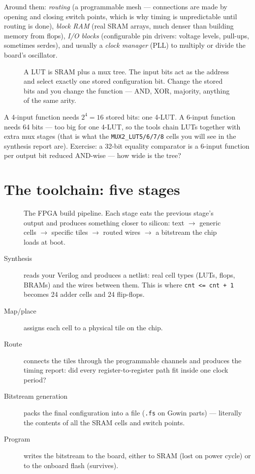 Around them: \emph{routing} (a programmable mesh --- connections are made by
opening and closing switch points, which is why timing is unpredictable until
routing is done), \emph{block RAM} (real SRAM arrays, much denser than building
memory from flops), \emph{I/O blocks} (configurable pin drivers: voltage
levels, pull-ups, sometimes serdes), and usually a \emph{clock manager} (PLL)
to multiply or divide the board's oscillator.

\begin{figure}[htbp]\centering

\caption{A LUT is SRAM plus a mux tree. The input bits act as the address and
select exactly one stored configuration bit. Change the stored bits and you
change the function --- AND, XOR, majority, anything of the same arity.}
\label{fig:lut}
\end{figure}

\begin{example}
A 4-input function needs $2^4=16$ stored bits: one 4-LUT. A 6-input function
needs 64 bits --- too big for one 4-LUT, so the tools chain LUTs together with
extra mux stages (that is what the \texttt{MUX2\_LUT5/6/7/8} cells you will see
in the synthesis report are). Exercise: a 32-bit equality comparator is a
6-input function per output bit reduced AND-wise --- how wide is the tree?
\end{example}

\section{The toolchain: five stages}

\begin{figure}[htbp]\centering

\caption{The FPGA build pipeline. Each stage eats the previous stage's output
and produces something closer to silicon: text $\to$ generic cells $\to$
specific tiles $\to$ routed wires $\to$ a bitstream the chip loads at boot.}
\label{fig:flow13}
\end{figure}

\begin{description}
\item[Synthesis] reads your Verilog and produces a netlist: real cell types
(LUTs, flops, BRAMs) and the wires between them. This is where
\texttt{cnt <= cnt + 1} becomes 24 adder cells and 24 flip-flops.
\item[Map/place] assigns each cell to a physical tile on the chip.
\item[Route] connects the tiles through the programmable channels and produces
the timing report: did every register-to-register path fit inside one clock
period?
\item[Bitstream generation] packs the final configuration into a file
(\texttt{.fs} on Gowin parts) --- literally the contents of all the SRAM cells
and switch points.
\item[Program] writes the bitstream to the board, either to SRAM (lost on power
cycle) or to the onboard flash (survives).
\end{description}

